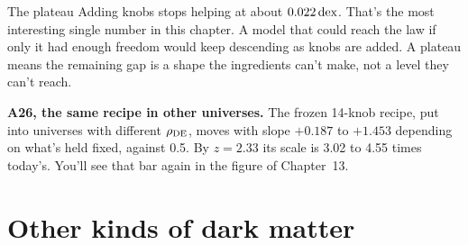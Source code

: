 \begin{knobbox}{The plateau}
Adding knobs stops helping at about $0.022\,\mathrm{dex}$. That's the most interesting single number in this chapter. A model that could reach the law if only it had enough freedom would keep descending as knobs are added. A plateau means the remaining gap is a shape the ingredients can't make, not a level they can't reach.
\end{knobbox}




\textbf{A26, the same recipe in other universes.} The frozen 14-knob recipe, put into universes with different $\rho_{\rm DE}$, moves with slope $+0.187$ to $+1.453$ depending on what's held fixed, against 0.5. By $z=2.33$ its scale is 3.02 to 4.55 times today's. You'll see that bar again in the figure of Chapter~13.

\section{Other kinds of dark matter}


